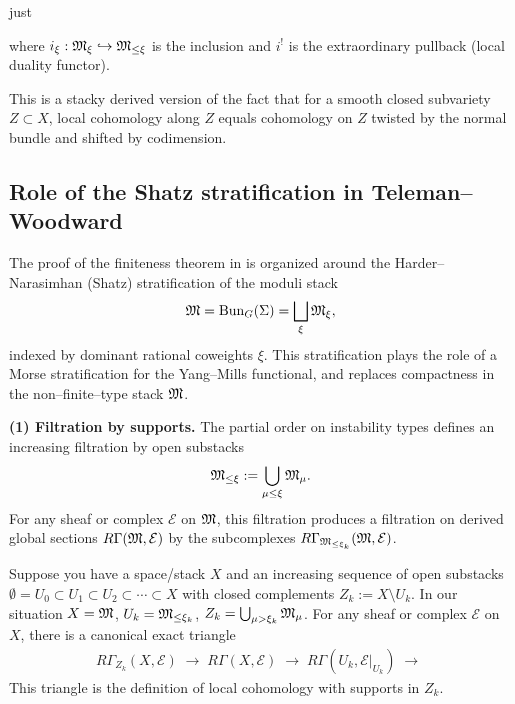just \documentclass[12pt]{article}
\begin{document}
where \(i_\xi:\mathfrak{M}_\xi\hookrightarrow \mathfrak{M}_{\le \xi}\) is the inclusion and $i^!$ is the extraordinary pullback (local duality functor).

This is a stacky derived version of the fact that for a smooth closed subvariety $Z \subset X$, local cohomology along $Z$ equals cohomology on $Z$ twisted by the normal bundle and shifted by codimension.


\subsection*{Role of the Shatz stratification in Teleman--Woodward}

The proof of the finiteness theorem in \cite{TelemanWoodward} is organized around
the Harder--Narasimhan (Shatz) stratification of the moduli stack
\[
\mathfrak{M}=\operatorname{Bun}_G(\Sigma)=\bigsqcup_{\xi}\mathfrak{M}_\xi,
\]
indexed by dominant rational coweights $\xi$.  This stratification plays the role
of a Morse stratification for the Yang--Mills functional, and replaces compactness
in the non--finite--type stack $\mathfrak{M}$.

\medskip
\noindent\textbf{(1) Filtration by supports.}
The partial order on instability types defines an increasing filtration by open
substacks
\[
\mathfrak{M}_{\le \xi} := \bigcup_{\mu\le\xi}\mathfrak{M}_\mu.
\]
For any sheaf or complex $\mathcal E$ on \(\mathfrak{M}\), this filtration produces a filtration on derived global sections
$R\Gamma(\mathfrak{M},\mathcal E)$
by the subcomplexes
$R\Gamma_{\mathfrak{M}_{\le \xi_k}}(\mathfrak{M},\mathcal E)$.

\begin{remark}
    Suppose you have a space/stack $X$ and an increasing sequence of open substacks
$\emptyset = U_0 \subset U_1 \subset U_2 \subset \cdots \subset X$
with closed complements
$Z_k := X \setminus U_k$. In our situation \(X = \mathfrak{M}\), \(U_k = \mathfrak{M}_{\le \xi_k}\), \(Z_k = \bigcup_{\mu > \xi_k} \mathfrak{M}_\mu\). For any sheaf or complex $\mathcal E$ on $X$, there is a canonical exact triangle\begin{align*}
R\Gamma_{Z_k}(X,\mathcal E)
\;\to\;
R\Gamma(X,\mathcal E)
\;\to\;
R\Gamma(U_k,\mathcal E|_{U_k})
\;\to\;
\end{align*}
This triangle is the definition of local cohomology with supports in $Z_k$.
\end{remark}
\end{document}
